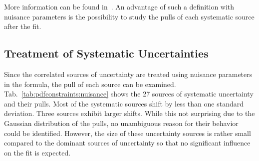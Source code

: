 More information can be found
in~\cite{Alekhin:2014irh,Abramowicz:2015mha}. An advantage of such a \chisq
definition with nuisance parameters is the possibility to study the pulls of
each systematic source after the fit.

\subsection{Treatment of Systematic Uncertainties}
\label{section:cmsdatauncertainties}

Since the correlated sources of uncertainty are treated using nuisance
parameters in the \chisq formula, the pull of each source can be examined.
Tab.~\ref{tab:pdfconstraints:nuisance} shows the 27 sources of systematic
uncertainty and their pulls. Most of the systematic sources shift by less than
one standard deviation. Three sources exhibit larger shifts. While this not
surprising due to the Gaussian distribution of the pulls, no unambiguous
reason for their behavior could be identified. However, the size of these
uncertainty sources is rather small compared to the dominant sources of
uncertainty so that no significant influence on the fit is expected.

